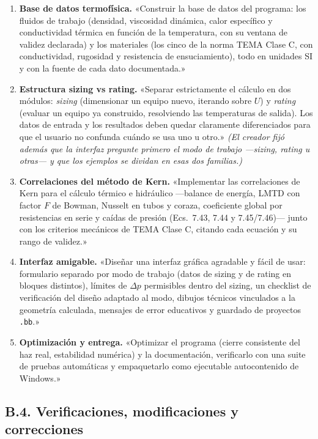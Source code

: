 \documentclass[11pt,a4paper]{article}
\begin{document}
\begin{enumerate}
\item \textbf{Base de datos termof\'isica.} «Construir la base de datos del
programa: los fluidos de trabajo (densidad, viscosidad din\'amica, calor
espec\'ifico y conductividad t\'ermica en funci\'on de la temperatura, con su
ventana de validez declarada) y los materiales (los cinco de la norma TEMA
Clase C, con conductividad, rugosidad y resistencia de ensuciamiento), todo
en unidades SI y con la fuente de cada dato documentada.»
\item \textbf{Estructura sizing vs rating.} «Separar estrictamente el
c\'alculo en dos m\'odulos: \emph{sizing} (dimensionar un equipo nuevo,
iterando sobre $U$) y \emph{rating} (evaluar un equipo ya construido,
resolviendo las temperaturas de salida). Los datos de entrada y los
resultados deben quedar claramente diferenciados para que el usuario no
confunda cu\'ando se usa uno u otro.» \emph{(El creador fij\'o adem\'as que
la interfaz pregunte primero el modo de trabajo ---sizing, rating u otras---
y que los ejemplos se dividan en esas dos familias.)}
\item \textbf{Correlaciones del m\'etodo de Kern.} «Implementar las
correlaciones de Kern para el c\'alculo t\'ermico e hidr\'aulico ---balance
de energ\'ia, LMTD con factor $F$ de Bowman, Nusselt en tubos y coraza,
coeficiente global por resistencias en serie y ca\'idas de presi\'on
(Ecs.~7.43, 7.44 y 7.45/7.46)--- junto con los criterios mec\'anicos de TEMA
Clase C, citando cada ecuaci\'on y su rango de validez.»
\item \textbf{Interfaz amigable.} «Dise\~nar una interfaz gr\'afica agradable
y f\'acil de usar: formulario separado por modo de trabajo (datos de sizing y
de rating en bloques distintos), l\'imites de $\Delta p$ permisibles dentro
del sizing, un checklist de verificaci\'on del dise\~no adaptado al modo,
dibujos t\'ecnicos vinculados a la geometr\'ia calculada, mensajes de error
educativos y guardado de proyectos \texttt{.bb}.»
\item \textbf{Optimizaci\'on y entrega.} «Optimizar el programa (cierre
consistente del haz real, estabilidad num\'erica) y la documentaci\'on,
verificarlo con una suite de pruebas autom\'aticas y empaquetarlo como
ejecutable autocontenido de Windows.»
\end{enumerate}

\subsection*{B.4. Verificaciones, modificaciones y correcciones}
\end{document}

